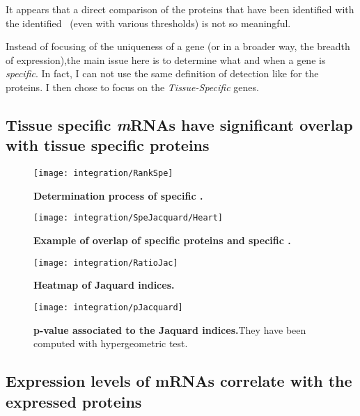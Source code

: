 It appears that a direct comparison of the proteins that have been identified
with the identified \mRNAs\ (even with various thresholds) is not so meaningful.

Instead of focusing of the uniqueness of a gene (or in a broader way, the breadth
of expression),the main issue here is to
determine what and when a gene is \emph{specific}. In fact, I can not use
the same definition of detection like for the proteins. I then chose to focus
on the \emph{Tissue-Specific} genes.

\subsection{Tissue specific \textit{m}RNAs have significant overlap with tissue
specific proteins}

\begin{figure}[!htbp]
\texttt{[image: integration/RankSpe]}\centering
    \caption[Determination process of specific
    mRNAs]{\label{fig:RankSpe}\textbf{Determination process of specific \mRNAs.}}
\end{figure}


\begin{figure}[!htbp]
\texttt{[image: integration/SpeJacquard/Heart]}\centering
    \caption[Example of overlap of specific protein and specific
    mRNAs for heart]{\label{fig:ExJacquard}\textbf{Example of overlap of
    specific proteins and specific \mRNAs.}}
\end{figure}


\begin{figure}[!htbp]
\texttt{[image: integration/RatioJac]}\centering
    \caption[Heatmap of Jaquard indices]{\label{fig:RatioJac}\textbf{Heatmap of
    Jaquard indices.}}
\end{figure}

\begin{figure}[!htbp]
\texttt{[image: integration/pJacquard]}\centering
    \caption[p-values associated to the Jaquard
    indices]{\label{fig:pJacquard}\textbf{p-value associated to the Jaquard
    indices.}They have been computed with hypergeometric test.}
\end{figure}

\subsection{Expression levels of mRNAs correlate with the expressed proteins}

